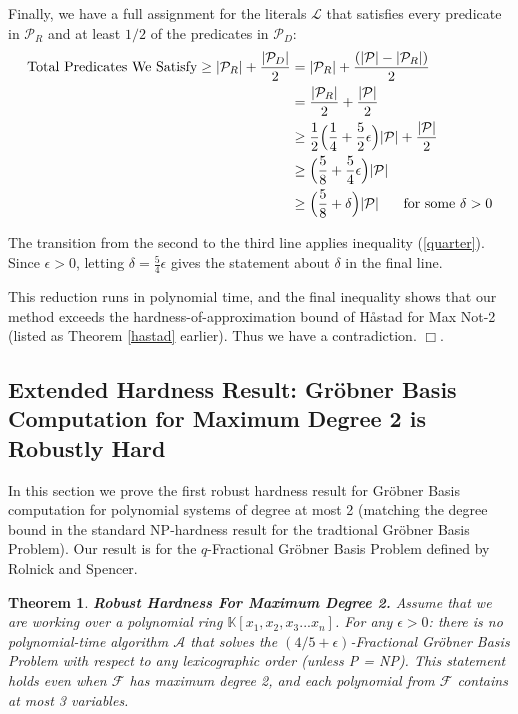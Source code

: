 \documentclass{article}
\newtheorem{theorem}{Theorem}[]
\begin{document}
Finally, we have a full assignment for the literals $\mathcal{L}$ that satisfies every predicate in $\mathcal{P}_R$ and at least $1/2$ of the predicates in $\mathcal{P}_D$:
\begin{align*}
\text{Total Predicates We Satisfy}\geq|\mathcal{P}_R|+\frac{|\mathcal{P}_D|}{2} &= 
|\mathcal{P}_R|+\frac{(|\mathcal{P}|-|\mathcal{P}_R|)}{2}\\
&= 
\frac{|\mathcal{P}_R|}{2}+\frac{|\mathcal{P}|}{2}\\
&\geq 
\frac{1}{2}\Big(\frac{1}{4}+\frac{5}{2}\epsilon\Big)|\mathcal{P}|+\frac{|\mathcal{P}|}{2}\\
&\geq 
\Big(\frac{5}{8}+\frac{5}{4}\epsilon\Big)|\mathcal{P}|\\
&\geq 
\Big(\frac{5}{8}+\delta\Big)|\mathcal{P}| \hspace{5mm} \text{ for some  $\delta>0$}
\end{align*}

The transition from the second to the third line applies inequality (\ref{quarter}). Since $\epsilon>0$, letting $\delta=\frac{5}{4}\epsilon$ gives the statement about $\delta$ in the final line. 

This reduction runs in polynomial time, and the
final inequality shows that our method exceeds the hardness-of-approximation bound of H{\aa}stad for Max Not-2 (listed as Theorem \ref{hastad} earlier). Thus we have a contradiction. $\Box$.




\subsection{Extended Hardness Result: Gr\"{o}bner Basis Computation for Maximum Degree 2 is Robustly Hard} \label{deg2sec}

In this section we prove the first robust hardness result for Gr\"{o}bner Basis computation for polynomial systems of degree at most 2 (matching the degree bound in the standard NP-hardness result for the tradtional Gr\"{o}bner Basis Problem). Our result is for the $q$-Fractional Gr\"{o}bner Basis Problem defined by Rolnick and Spencer.  

\begin{theorem} \textbf{Robust Hardness For Maximum Degree 2.} \label{extfracharddeg2}
Assume that we are working over a polynomial ring $\mathbb{K}[x_1,x_2,x_3...x_n]$. For any $\epsilon>0$: there is no polynomial-time algorithm $\mathcal{A}$ that solves the $(4/5+\epsilon)$-Fractional Gr\"{o}bner Basis Problem with respect to any lexicographic order (unless P = NP). This statement holds even when $\mathcal{F}$ has maximum degree 2, and each polynomial from $\mathcal{F}$ contains at most 3 variables.
\end{theorem}
\end{document}
